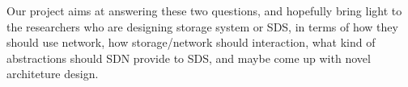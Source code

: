 Our project aims at answering these two questions, and hopefully bring light to the researchers who are designing storage system or SDS, in terms of how they should use network, how storage/network should interaction, what kind of abstractions should SDN provide to SDS, and maybe come up with novel architeture design.




